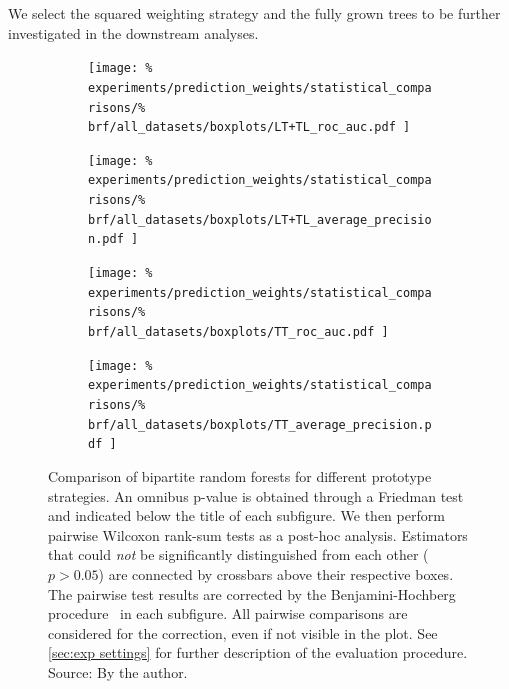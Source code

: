 
We select the squared weighting strategy and the fully grown trees to be further investigated in the downstream analyses. %


\begin{figure}[tb]
    \centering
    \begin{subfigure}{0.49\textwidth}
        \texttt{[image: \%
            experiments/prediction\_weights/statistical\_comparisons/\%
            brf/all\_datasets/boxplots/LT+TL\_roc\_auc.pdf
        ]}
    \end{subfigure}
    \begin{subfigure}{0.49\textwidth}
        \texttt{[image: \%
            experiments/prediction\_weights/statistical\_comparisons/\%
            brf/all\_datasets/boxplots/LT+TL\_average\_precision.pdf
        ]}
    \end{subfigure}

    \begin{subfigure}{0.49\textwidth}
        \texttt{[image: \%
            experiments/prediction\_weights/statistical\_comparisons/\%
            brf/all\_datasets/boxplots/TT\_roc\_auc.pdf
        ]}
    \end{subfigure}
    \begin{subfigure}{0.49\textwidth}
        \texttt{[image: \%
            experiments/prediction\_weights/statistical\_comparisons/\%
            brf/all\_datasets/boxplots/TT\_average\_precision.pdf
        ]}
    \end{subfigure}
    \caption{
        Comparison of bipartite random forests for different prototype strategies.
        An omnibus p-value is obtained through a Friedman test and indicated below the title of each subfigure.
        We then perform pairwise Wilcoxon rank-sum tests as a post-hoc analysis.
        Estimators that could \emph{not} be significantly distinguished from each other ($p > 0.05$) are connected by crossbars above their respective boxes. 
        The pairwise test results are corrected by the Benjamini-Hochberg procedure~\cite{benjamini1995controlling,haynes2013benjamini} in each subfigure. All pairwise comparisons are considered for the correction, even if not visible in the plot.
        See \autoref{sec:exp settings} for further description of the evaluation procedure. \newline Source: By the author.
    }
    \label{fig:pred_weights_brf}
\end{figure}


